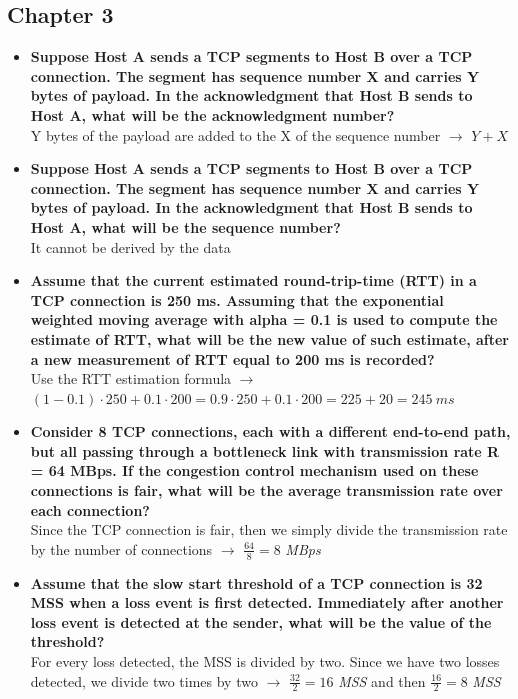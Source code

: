 \documentclass{article}
\begin{document}
\subsection{Chapter 3}
\begin{itemize}
	\item \textbf{Suppose Host A sends a TCP segments to Host B over a TCP connection. The segment has sequence number X and carries Y bytes of payload. In the acknowledgment that Host B sends to Host A, what will be the acknowledgment number?}
	\vspace{.2cm} \\
	Y bytes of the payload are added to the X of the sequence number $\rightarrow$ $Y + X$
	
	\item \textbf{Suppose Host A sends a TCP segments to Host B over a TCP connection. The segment has sequence number X and carries Y bytes of payload. In the acknowledgment that Host B sends to Host A, what will be the sequence number?}
	\vspace{.2cm} \\
	It cannot be derived by the data
	
	\item \textbf{Assume that the current estimated round-trip-time (RTT) in a TCP connection is 250 ms. Assuming that the exponential weighted moving average with alpha = 0.1 is used to compute the estimate of RTT, what will be the new value of such estimate, after a new measurement of RTT equal to 200 ms is recorded?}
	\vspace{.2cm} \\
	Use the RTT estimation formula $\rightarrow$ $(1 - 0.1) \cdot 250 + 0.1 \cdot 200 = 0.9 \cdot 250 + 0.1 \cdot 200 = 225 + 20 = 245~ms$
	
	\item \textbf{Consider 8 TCP connections, each with a different end-to-end path, but all passing through a bottleneck link with transmission rate R = 64 MBps. If the congestion control mechanism used on these connections is fair, what will be the average transmission rate over each connection?}
	\vspace{.2cm} \\
	Since the TCP connection is fair, then we simply divide the transmission rate by the number of connections $\rightarrow$ $\frac{64}{8} = 8$ \textit{MBps}
	
	\item \textbf{Assume that the slow start threshold of a TCP connection is 32 MSS when a loss event is first detected. Immediately after another loss event is detected at the sender, what will be the value of the threshold?}
	\vspace{.2cm} \\
	For every loss detected, the MSS is divided by two. Since we have two losses detected, we divide two times by two $\rightarrow$ $\frac{32}{2} = 16$ \textit{MSS} and then $\frac{16}{2} = 8$ \textit{MSS}
\end{itemize}
\end{document}
